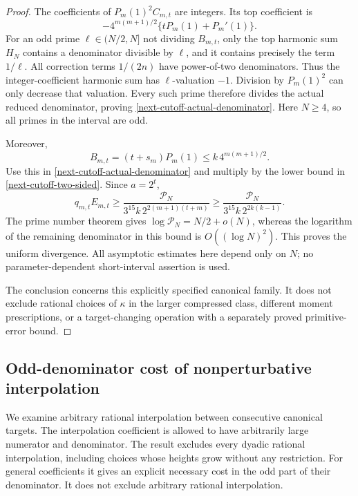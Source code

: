 \documentclass[11pt,a4paper]{article}
\theoremstyle{definition}
\theoremstyle{remark}
\begin{document}
\begin{proof}
The coefficients of $P_m(1)^2 C_{m,t}$ are integers. Its top
coefficient is
\[
 -4^{m(m+1)/2}\{tP_m(1)+P_m'(1)\}.
\]
For an odd prime $\ell\in(N/2,N]$ not dividing $B_{m,t}$, only the top
harmonic sum $H_N$ contains a denominator divisible by $\ell$, and it
contains precisely the term $1/\ell$. All correction terms $1/(2n)$
have power-of-two denominators. Thus the integer-coefficient harmonic
sum has $\ell$-valuation $-1$. Division by $P_m(1)^2$ can only decrease
that valuation. Every such prime therefore divides the actual reduced
denominator, proving \eqref{next-cutoff-actual-denominator}. Here
$N\ge4$, so all primes in the interval are odd.

Moreover,
\[
 B_{m,t}=(t+s_m)P_m(1)
 \le k\,4^{m(m+1)/2}.
\]
Use this in \eqref{next-cutoff-actual-denominator} and multiply by the
lower bound in \eqref{next-cutoff-two-sided}. Since $a=2^t$,
\[
 q_{m,t}E_{m,t}\ge
 \frac{\mathcal P_N}
 {3^{15}k\,2^{2(m+1)(t+m)}}
 \ge
 \frac{\mathcal P_N}{3^{15}k\,2^{2k(k-1)}}.
\]
The prime number theorem \cite{dlmf-primes} gives
$\log\mathcal P_N=N/2+o(N)$, whereas the logarithm of the remaining
denominator in this bound is $O((\log N)^2)$. This proves the uniform
divergence. All asymptotic estimates here depend only on $N$; no
parameter-dependent short-interval assertion is used.

The conclusion concerns this explicitly specified canonical family.
It does not exclude rational choices of $\kappa$ in the larger
compressed class, different moment prescriptions, or a target-changing
operation with a separately proved primitive-error bound.
\end{proof}

\subsection{Odd-denominator cost of nonperturbative interpolation}
\label{stage3-arithmetic-section}

We examine arbitrary rational interpolation between consecutive canonical
targets. The interpolation coefficient is allowed to have arbitrarily
large numerator and denominator. The result excludes every dyadic rational
interpolation, including choices whose heights grow without any restriction.
For general coefficients it gives an explicit necessary cost in the odd
part of their denominator. It does not exclude arbitrary rational
interpolation.
\end{document}
